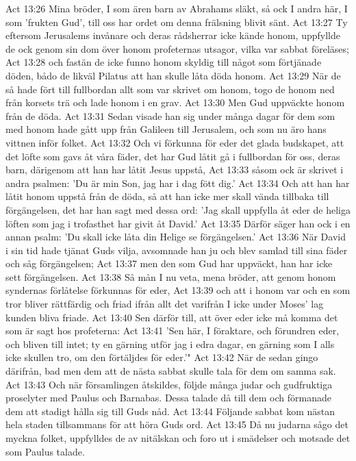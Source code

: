 Act 13:26  Mina bröder, I som ären barn av Abrahams släkt, så ock I andra här, I som 'frukten Gud', till oss har ordet om denna frälsning blivit sänt.
Act 13:27  Ty eftersom Jerusalems invånare och deras rådsherrar icke kände honom, uppfyllde de ock genom sin dom över honom profeternas utsagor, vilka var sabbat föreläses;
Act 13:28  och fastän de icke funno honom skyldig till något som förtjänade döden, bådo de likväl Pilatus att han skulle låta döda honom.
Act 13:29  När de så hade fört till fullbordan allt som var skrivet om honom, togo de honom ned från korsets trä och lade honom i en grav.
Act 13:30  Men Gud uppväckte honom från de döda.
Act 13:31  Sedan visade han sig under många dagar för dem som med honom hade gått upp från Galileen till Jerusalem, och som nu äro hans vittnen inför folket.
Act 13:32  Och vi förkunna för eder det glada budskapet, att det löfte som gavs åt våra fäder, det har Gud låtit gå i fullbordan för oss, deras barn, därigenom att han har låtit Jesus uppstå,
Act 13:33  såsom ock är skrivet i andra psalmen: 'Du är min Son, jag har i dag fött dig.'
Act 13:34  Och att han har låtit honom uppstå från de döda, så att han icke mer skall vända tillbaka till förgängelsen, det har han sagt med dessa ord: 'Jag skall uppfylla åt eder de heliga löften som jag i trofasthet har givit åt David.'
Act 13:35  Därför säger han ock i en annan psalm: 'Du skall icke låta din Helige se förgängelsen.'
Act 13:36  När David i sin tid hade tjänat Guds vilja, avsomnade han ju och blev samlad till sina fäder och såg förgängelsen;
Act 13:37  men den som Gud har uppväckt, han har icke sett förgängelsen.
Act 13:38  Så mån I nu veta, mena bröder, att genom honom syndernas förlåtelse förkunnas för eder,
Act 13:39  och att i honom var och en som tror bliver rättfärdig och friad ifrån allt det varifrån I icke under Moses' lag kunden bliva friade.
Act 13:40  Sen därför till, att över eder icke må komma det som är sagt hos profeterna:
Act 13:41  'Sen här, I föraktare, och förundren eder, och bliven till intet; ty en gärning utför jag i edra dagar, en gärning som I alls icke skullen tro, om den förtäljdes för eder.'"
Act 13:42  När de sedan gingo därifrån, bad men dem att de nästa sabbat skulle tala för dem om samma sak.
Act 13:43  Och när församlingen åtskildes, följde många judar och gudfruktiga proselyter med Paulus och Barnabas. Dessa talade då till dem och förmanade dem att stadigt hålla sig till Guds nåd.
Act 13:44  Följande sabbat kom nästan hela staden tillsammans för att höra Guds ord.
Act 13:45  Då nu judarna sågo det myckna folket, uppfylldes de av nitälskan och foro ut i smädelser och motsade det som Paulus talade.
